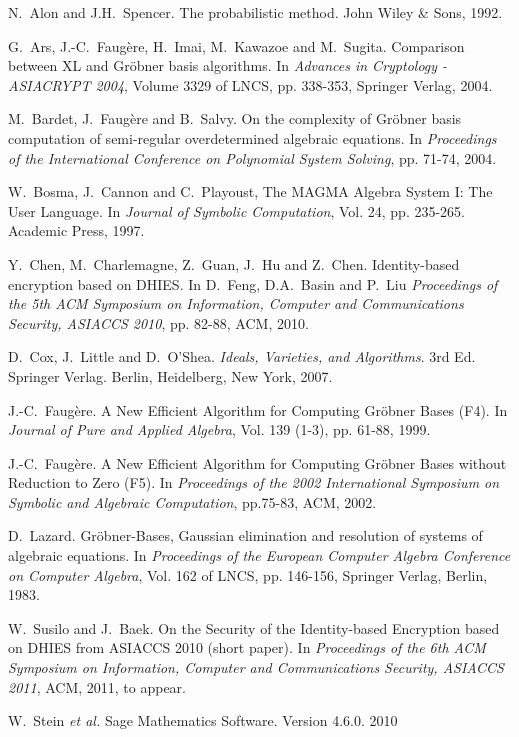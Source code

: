 \documentclass{llncs}
\begin{document}
\begin{thebibliography}{10}
 N.~Alon and J.H.~Spencer. The probabilistic method. John Wiley \& Sons, 1992.

 G.~Ars, J.-C.~Faug\`ere, H.~Imai, M.~Kawazoe and M.~Sugita. Comparison between {XL} and {G}r\"obner basis algorithms. In \emph{Advances in Cryptology - ASIACRYPT 2004}, Volume 3329 of LNCS, pp. 338-353, Springer Verlag, 2004.

 M.~Bardet, J.~Faug\`{e}re and B.~Salvy. On the complexity of Gr\"{o}bner basis computation of semi-regular overdetermined algebraic equations. In \emph{Proceedings of the International Conference on Polynomial System Solving}, pp. 71-74, 2004.

 W.~Bosma, J.~Cannon and C.~Playoust, {The {MAGMA} {A}lgebra {S}ystem {I}: {T}he {U}ser {L}anguage}. In \emph{Journal of Symbolic Computation}, Vol. 24, pp. 235-265. Academic Press, 1997.

 Y.~Chen, M.~Charlemagne, Z.~Guan, J.~Hu and Z.~Chen. Identity-based encryption based on DHIES. In D.~Feng, D.A.~Basin and P.~Liu \emph{Proceedings of the 5th ACM Symposium on Information, Computer and Communications Security, ASIACCS 2010}, pp. 82-88, ACM, 2010.

 D.~Cox, J.~Little and D.~O'Shea. \emph{Ideals, Varieties, and Algorithms}. 3rd Ed. Springer Verlag. Berlin, Heidelberg, New York, 2007.

 J.-C.~Faug\`{e}re. A New Efficient Algorithm for Computing {G}r{\"o}bner Bases ({F4}). In \emph{Journal of Pure and Applied Algebra}, Vol.
139 (1-3), pp. 61-88, 1999.

 J.-C.~Faug\`{e}re. A New Efficient Algorithm for Computing {G}r{\"o}bner Bases without Reduction to Zero ({F5}). In \emph{Proceedings of the 2002 International Symposium on Symbolic and Algebraic Computation}, pp.75-83, ACM, 2002.

 D.~Lazard. Gr\"obner-Bases, {G}aussian elimination and resolution of systems of algebraic equations. In \emph{Proceedings of the European Computer Algebra Conference on Computer Algebra}, Vol. 162 of LNCS, pp. 146-156, Springer Verlag, Berlin, 1983.

 W.~Susilo and J.~Baek. On the Security of the Identity-based Encryption based on {DHIES} from {ASIACCS 2010} (short paper). In \emph{Proceedings of the 6th ACM Symposium on Information, Computer and Communications Security, ASIACCS 2011}, ACM, 2011, to appear.

 W.~Stein \emph{et al.} Sage Mathematics Software. Version 4.6.0. 2010
\end{thebibliography}
\end{document}
